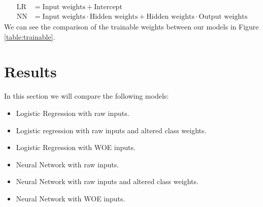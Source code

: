 \begin{equation*}
\begin{split}
    \mbox{LR} &= \mbox{Input weights} + \mbox{Intercept}
    \\
    \mbox{NN} &= \mbox{Input weights} \cdot \mbox{Hidden weights} + \mbox{Hidden weights} \cdot \mbox{Output weights}
    \end{split}
\end{equation*}
We can see the comparison of the trainable weights between our models in Figure \ref{table:trainable}.
 \begin{table}[h!]
 \footnotesize
\begin{center}
\par\end{center}
\caption{Trainable Weights}\label{table:trainable}
\end{table}
\section{Results}
In this section we will compare the following models:
\begin{itemize}
    \item Logistic Regression with raw inputs.
    \item Logistic regression with raw inputs and altered class weights.
    \item Logistic Regression with WOE inputs.
    \item Neural Network with raw inputs.
    \item Neural Network with raw inputs and altered class weights.
    \item Neural Network with WOE inputs.
\end{itemize}

